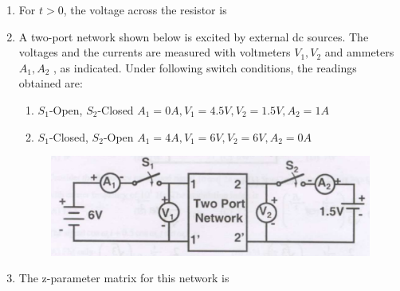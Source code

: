 \documentclass[a4paper, 11pt]{article}
\begin{document}
\begin{enumerate}
    \item For $t>0$, the voltage across the resistor is
    \begin{enumerate}
    \end{enumerate}
    
    \hfill{}

    \item[] A two-port network shown below is excited by external dc sources. The voltages and the currents are measured with voltmeters $V_1, V_2$ and ammeters $A_1, A_2$ , as indicated. Under following switch conditions, the readings obtained are:
    \begin{enumerate}[label=\roman*.]
        \item $S_1$-Open, $S_2$-Closed $A_1=0A, V_1=4.5V, V_2=1.5V, A_2=1A$
        \item $S_1$-Closed, $S_2$-Open $A_1=4A, V_1=6V, V_2=6V, A_2=0A$
    \end{enumerate}
    
    \begin{figure}[H]
        \centering
        \includegraphics[width=0.8\columnwidth]{figs/q76.png}
        \caption*{}
        \label{fig:q76}
    \end{figure}
    
    \item The z-parameter matrix for this network is
    \begin{enumerate}
    \end{enumerate}
    

\end{enumerate}
\end{document}
